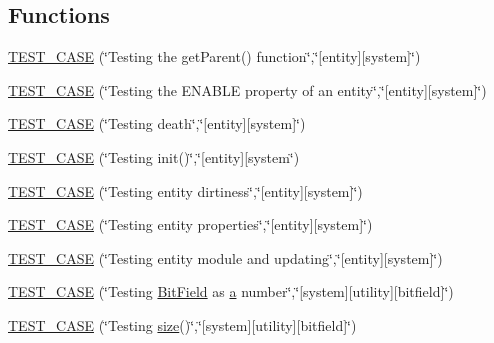 \subsection*{Functions}
\begin{DoxyCompactItemize}
\item 
\hyperlink{namespacemc_a95fb7668832dd82bbfce05b7aca798d0}{T\+E\+S\+T\+\_\+\+C\+A\+SE} (\char`\"{}Testing the get\+Parent() function\char`\"{},\char`\"{}\mbox{[}entity\mbox{]}\mbox{[}system\mbox{]}\char`\"{})
\item 
\hyperlink{namespacemc_a45e372877d6016c37d2499becb379df4}{T\+E\+S\+T\+\_\+\+C\+A\+SE} (\char`\"{}Testing the E\+N\+A\+B\+LE property of an entity\char`\"{},\char`\"{}\mbox{[}entity\mbox{]}\mbox{[}system\mbox{]}\char`\"{})
\item 
\hyperlink{namespacemc_a489dfcbec3e71624a82e7e8dd42f6c0d}{T\+E\+S\+T\+\_\+\+C\+A\+SE} (\char`\"{}Testing death\char`\"{},\char`\"{}\mbox{[}entity\mbox{]}\mbox{[}system\mbox{]}\char`\"{})
\item 
\hyperlink{namespacemc_aa2adab45b377fde9937b1b5f1b4e3e49}{T\+E\+S\+T\+\_\+\+C\+A\+SE} (\char`\"{}Testing init()\char`\"{},\char`\"{}\mbox{[}entity\mbox{]}\mbox{[}system\char`\"{})
\item 
\hyperlink{namespacemc_a508f2de7fdb4e3772707839f28c5fb8d}{T\+E\+S\+T\+\_\+\+C\+A\+SE} (\char`\"{}Testing entity dirtiness\char`\"{},\char`\"{}\mbox{[}entity\mbox{]}\mbox{[}system\mbox{]}\char`\"{})
\item 
\hyperlink{namespacemc_a43769b3a0a6d44c057908ff95940cfe4}{T\+E\+S\+T\+\_\+\+C\+A\+SE} (\char`\"{}Testing entity properties\char`\"{},\char`\"{}\mbox{[}entity\mbox{]}\mbox{[}system\mbox{]}\char`\"{})
\item 
\hyperlink{namespacemc_ac7240d888ff417bcccfbcc8645bbae07}{T\+E\+S\+T\+\_\+\+C\+A\+SE} (\char`\"{}Testing entity module and updating\char`\"{},\char`\"{}\mbox{[}entity\mbox{]}\mbox{[}system\mbox{]}\char`\"{})
\item 
\hyperlink{namespacemc_ad72b370bc217290cfdb9e481f9930400}{T\+E\+S\+T\+\_\+\+C\+A\+SE} (\char`\"{}Testing \hyperlink{structmc_1_1_bit_field}{Bit\+Field} as \hyperlink{_s_d_l__opengl__glext_8h_a3309789fc188587d666cda5ece79cf82}{a} number\char`\"{},\char`\"{}\mbox{[}system\mbox{]}\mbox{[}utility\mbox{]}\mbox{[}bitfield\mbox{]}\char`\"{})
\item 
\hyperlink{namespacemc_a913d64a20dcda34b3c2bc2fc468ddf2d}{T\+E\+S\+T\+\_\+\+C\+A\+SE} (\char`\"{}Testing \hyperlink{_s_d_l__opengl__glext_8h_a3d1e3edfcf61ca2d831883e1afbad89e}{size}()\char`\"{},\char`\"{}\mbox{[}system\mbox{]}\mbox{[}utility\mbox{]}\mbox{[}bitfield\mbox{]}\char`\"{})

\end{DoxyCompactItemize}
